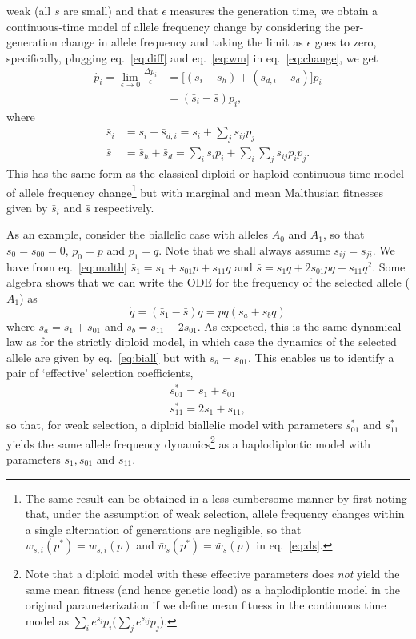 \documentclass[
  11pt,
]{article}
\begin{document}
weak (all \(s\) are small) and that \(\epsilon\) measures the generation
time, we obtain a continuous-time model of allele frequency change by
considering the per-generation change in allele frequency and taking the
limit as \(\epsilon\) goes to zero, specifically, plugging
eq.~\ref{eq:diff} and eq.~\ref{eq:wm} in eq.~\ref{eq:change}, we get
\begin{align}
  \dot{p_i} = \lim_{\epsilon\rightarrow 0}
     \frac{\Delta p_i}{\epsilon} &= 
  \big[(s_i - \bar{s}_h) + (\bar{s}_{d,i} - \bar{s}_d)\big]p_i \nonumber \\
  &= (\bar{s}_i - \bar{s})p_i,
\end{align} where \begin{align}
    \bar{s}_i &= s_i + \bar{s}_{d,i} = s_i + \sum_{j}s_{ij}p_j \nonumber \\
    \bar{s} &= \bar{s}_h + \bar{s}_{d} = \sum_i s_i p_i + \sum_i \sum_j s_{ij}
    p_i p_j.
    \label{eq:malth}
\end{align} This has the same form as the classical diploid or haploid
continuous-time model of allele frequency change\footnote{The same
  result can be obtained in a less cumbersome manner by first noting
  that, under the assumption of weak selection, allele frequency changes
  within a single alternation of generations are negligible, so that
  \(w_{s,i}(p^\ast) = w_{s,i}(p)\) and
  \(\bar{w}_s(p^\ast) = \bar{w}_s(p)\) in eq.~\ref{eq:ds}.} but with
marginal and mean Malthusian fitnesses given by \(\bar{s}_i\) and
\(\bar{s}\) respectively.

As an example, consider the biallelic case with alleles \(A_0\) and
\(A_1\), so that \(s_0 = s_{00} = 0\), \(p_0 = p\) and \(p_1=q\). Note
that we shall always assume \(s_{ij} = s_{ji}\). We have from
eq.~\ref{eq:malth} \(\bar{s}_1 = s_1 + s_{01}p + s_{11}q\) and
\(\bar{s} = s_1q + 2s_{01}pq + s_{11}q^2\). Some algebra shows that we
can write the ODE for the frequency of the selected allele (\(A_1\)) as
\begin{equation}
  \dot{q} = (\bar{s}_1 - \bar{s})q = pq(s_a + s_bq)
  \label{eq:biall}
  \end{equation} where \(s_a = s_1 + s_{01}\) and
\(s_b = s_{11} - 2s_{01}\). As expected, this is the same dynamical law
as for the strictly diploid model, in which case the dynamics of the
selected allele are given by eq.~\ref{eq:biall} but with
\(s_a = s_{01}\). This enables us to identify a pair of `effective'
selection coefficients, \begin{align}
  s_{01}^\ast = s_1 + s_{01} \nonumber \\
  s_{11}^\ast = 2s_1 + s_{11},
  \end{align} so that, for weak selection, a diploid biallelic model
with parameters \(s_{01}^\ast\) and \(s_{11}^\ast\) yields the same
allele frequency dynamics\footnote{Note that a diploid model with these
  effective parameters does \emph{not} yield the same mean fitness (and
  hence genetic load) as a haplodiplontic model in the original
  parameterization if we define mean fitness in the continuous time
  model as \(\sum_i e^{s_i} p_i \big(\sum_j e^{s_{ij}} p_j\big)\).} as a
haplodiplontic model with parameters \(s_1, s_{01}\) and \(s_{11}\).
\end{document}

